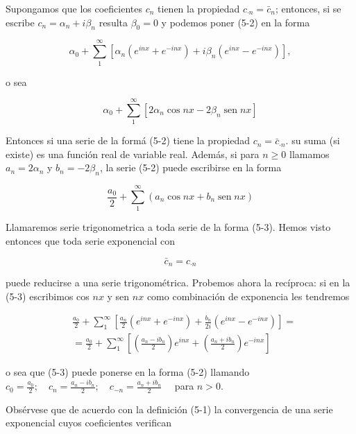 \documentclass[10pt]{article}
\theoremstyle{plain}
\theoremstyle{definition}
\theoremstyle{remark}
\begin{document}
Supongamos que los coeficientes $c_{n}$ tienen la propiedad $c_{\cdot n}=\bar{c}_{n}$; entonces, si se escribe $c_{n}=\alpha_{n}+i \beta_{n}$ resulta $\beta_{0}=0$ y podemos poner (5-2) en la forma



$$
\alpha_{0}+\sum_{1}^{\infty}\left[\alpha_{n}\left(e^{i n x}+e^{-i n x}\right)+i \beta_{n}\left(e^{i n x}-e^{-i n x}\right)\right],
$$

o sea

$$
\alpha_{0}+\sum_{1}^{\infty}\left[2 \alpha_{n} \cos n x-2 \beta_{n} \operatorname{sen} n x\right]
$$

Entonces si una serie de la formá (5-2) tiene la propiedad $c_{n}=\bar{c}_{\cdot n}$. su suma (si existe) es una función real de variable real. Además, si para $n \geqslant 0$ llamamos $a_{n}=2 \alpha_{n}$ y $b_{n}=-2 \beta_{n}$, la serie (5-2) puede escribirse en la forma


\begin{equation*}
\frac{a_{0}}{2}+\sum_{1}^{\infty}\left(a_{n} \cos n x+b_{n} \operatorname{sen} n x\right) \tag{$5\cdot3$}
\end{equation*}


Llamaremos serie trigonometrica a toda serie de la forma (5-3). Hemos visto entonces que toda serie exponencial con


\begin{equation*}
\bar{c}_{n}=c_{\cdot n} \tag{5-4}
\end{equation*}


puede reducirse a una serie trigonométrica. Probemos ahora la recíproca: si en la (5-3) escribimos cos $n x$ y sen $n x$ como combinación de exponencia les tendremos

$$
\begin{aligned}
& \frac{a_{0}}{2}+\sum_{1}^{\infty}\left[\frac{a_{n}}{2}\left(e^{i n x}+e^{-i n x}\right)+\frac{b_{n}}{2 i}\left(e^{i n x}-e^{-i n x}\right)\right]= \\
& =\frac{a_{0}}{2}+\sum_{1}^{\infty}\left[\left(\frac{a_{n}-i b_{n}}{2}\right) e^{i n x}+\left(\frac{a_{n}+i b_{n}}{2}\right) e^{-i n x}\right]
\end{aligned}
$$

o sea que (5-3) puede ponerse en la forma (5-2) llamando\\
$c_{0}=\frac{a_{0}}{2} ; \quad c_{n}=\frac{a_{n}-i b_{n}}{2} ; \quad c_{-n}=\frac{a_{n}+i b_{n}}{2} \quad$ para $n>0$.

Obsérvese que de acuerdo con la definición (5-1) la convergencia de una serie exponencial cuyos coeficientes verifican
\end{document}
